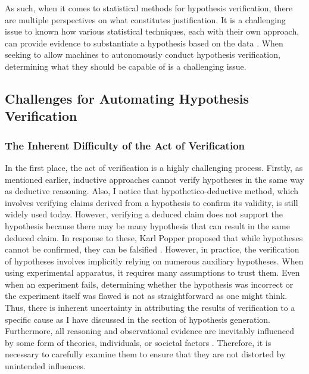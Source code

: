 \documentclass{article}
\begin{document}
As such, when it comes to statistical methods for hypothesis verification, there are multiple perspectives on what constitutes justification. It is a challenging issue to known how various statistical techniques, each with their own approach, can provide evidence to substantiate a hypothesis based on the data \cite{otsuka2022thinking,sober2008evidence,sep-statistics}. When seeking to allow machines to autonomously conduct hypothesis verification, determining what they should be capable of is a challenging issue. 

\subsection{Challenges for Automating Hypothesis Verification}

\subsubsection{The Inherent Difficulty of the Act of Verification}
In the first place, the act of verification is a highly challenging process. Firstly, as mentioned earlier, inductive approaches cannot verify hypotheses in the same way as deductive reasoning. Also, I notice that hypothetico-deductive method, which involves verifying claims derived from a hypothesis to confirm its validity, is still widely used today. However, verifying a deduced claim does not support the hypothesis because there may be many hypothesis that can result in the same deduced claim. In response to these, Karl Popper proposed that while hypotheses cannot be confirmed, they can be falsified \cite{sep-scientific-method}. However, in practice, the verification of hypotheses involves implicitly relying on numerous auxiliary hypotheses. When using experimental apparatus, it requires many assumptions to trust them. Even when an experiment fails, determining whether the hypothesis was incorrect or the experiment itself was flawed is not as straightforward as one might think. Thus, there is inherent uncertainty in attributing the results of verification to a specific cause \cite{chalmers2013thing,sep-physics-experiment,sep-scientific-underdetermination} as I have discussed in the section of hypothesis generation. Furthermore, all reasoning and observational evidence are inevitably influenced by some form of theories, individuals, or societal factors \cite{sep-science-theory-observation}. Therefore, it is necessary to carefully examine them to ensure that they are not distorted by unintended influences. 
\end{document}
